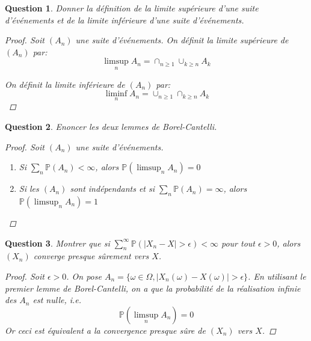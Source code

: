 \documentclass{article}
\theoremstyle{plain}
\newtheorem{question}{Question}
\begin{document}
\begin{question}
	Donner la définition de la limite supérieure d'une suite d'événements et de la limite inférieure d'une suite d'événements.
	\begin{proof}
		Soit $(A_n)$ une suite d'événements. On définit la limite supérieure de $(A_n)$ par:
		\begin{equation*}
			\limsup_n A_n = \cap_{n \geq 1} \cup_{k \geq n} A_k
		\end{equation*}

		On définit la limite inférieure de $(A_n)$ par:
		\begin{equation*}
			\liminf_n A_n = \cup_{n \geq 1} \cap_{k \geq n} A_k
		\end{equation*}
	\end{proof}
\end{question}

\begin{question}
	Enoncer les deux lemmes de Borel-Cantelli.
	\begin{proof}
		Soit $(A_n)$ une suite d'événements.
		\begin{enumerate}
			\item Si $\sum_n \mathbb{P} (A_n) < \infty$, alors $\mathbb{P} (\limsup_n A_n) = 0$
			\item Si les $(A_n)$ sont indépendants et si $\sum_n \mathbb{P} (A_n) = \infty$, alors $\mathbb{P} (\limsup_n A_n) = 1$
		\end{enumerate}
	\end{proof}
\end{question}


\begin{question}
	Montrer que si $\sum_n^{\infty} \mathbb{P} (|X_n - X| > \epsilon) < \infty$ pour tout $\epsilon > 0$, alors $(X_n)$ converge presque sûrement vers $X$.

	\begin{proof}
		Soit $\epsilon > 0$. On pose $A_n = \{\omega \in \Omega, |X_n(\omega) - X(\omega)| > \epsilon\}$. En utilisant le premier
		lemme de Borel-Cantelli, on a que la probabilité de la réalisation infinie des $A_n$ est nulle, i.e.
		\begin{equation*}
			\mathbb{P} (\limsup_n A_n) = 0
		\end{equation*}
		Or ceci est équivalent a la convergence presque sûre de $(X_n)$ vers $X$.
	\end{proof}
\end{question}
\end{document}
